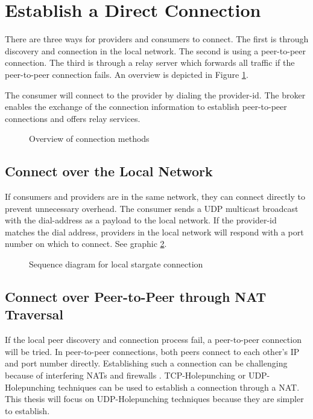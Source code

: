 \section{Establish a Direct Connection}
\label{Establish-a-Direct-Connection}

There are three ways for providers and consumers to connect. The first is through discovery and connection in the local network. The second is using a peer-to-peer connection. The third is through a relay server which forwards all traffic if the peer-to-peer connection fails. An overview is depicted in Figure \ref{fig:connection-methods}.

The consumer will connect to the provider by dialing the provider-id. The broker enables the exchange of the connection information to establish peer-to-peer connections and offers relay services.

\begin{figure}[h]
  \centering
  
  \caption{Overview of connection methods}
  \label{fig:connection-methods}
\end{figure}

\subsection{Connect over the Local Network}
\label{Connect-over-the-Local-Network}
If consumers and providers are in the same network, they can connect directly to prevent unnecessary overhead. The consumer sends a UDP multicast broadcast with the dial-address as a payload to the local network. If the provider-id matches the dial address, providers in the local network will respond with a port number on which to connect. See graphic \ref{fig:Sequence-Stargate-Local}.

\begin{figure}[h]
  \centering
  
  \caption{Sequence diagram for local stargate connection}
  \label{fig:Sequence-Stargate-Local}
\end{figure}

\subsection{Connect over Peer-to-Peer through NAT Traversal}
\label{Connect-over-Peer-to-Peer}

If the local peer discovery and connection process fail, a peer-to-peer connection will be tried. In peer-to-peer connections, both peers connect to each other's IP and port number directly. Establishing such a connection can be challenging because of interfering NATs and firewalls \cite{wei2008new}. TCP-Holepunching or UDP-Holepunching techniques can be used to establish a connection through a NAT. This thesis will focus on UDP-Holepunching techniques because they are simpler to establish.

